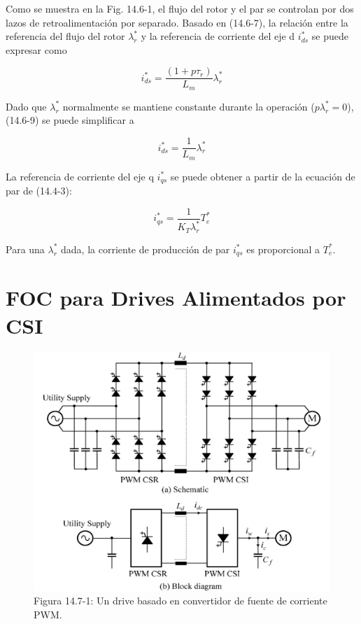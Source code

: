 \documentclass[letterpaper,12pt]{article}
\begin{document}
Como se muestra en la Fig. 14.6-1, el flujo del rotor y el par se controlan por dos lazos de retroalimentación por separado. Basado en (14.6-7), la relación entre la referencia del flujo del rotor $\lambda_r^*$ y la referencia de corriente del eje d $i_{ds}^*$ se puede expresar como

\begin{equation}
i_{ds}^* = \frac{(1 + p \tau_r)}{L_m} \lambda_r^* \tag{14.6-9}
\end{equation}

Dado que $\lambda_r^*$ normalmente se mantiene constante durante la operación ($p \lambda_r^* = 0$), (14.6-9) se puede simplificar a

\begin{equation}
i_{ds}^* = \frac{1}{L_m} \lambda_r^* \tag{14.6-10}
\end{equation}

La referencia de corriente del eje q $i_{qs}^*$ se puede obtener a partir de la ecuación de par de (14.4-3):

\begin{equation}
i_{qs}^* = \frac{1}{K_T \lambda_r^*} T_e^* \tag{14.6-11}
\end{equation}

Para una $\lambda_r^*$ dada, la corriente de producción de par $i_{qs}^*$ es proporcional a $T_e^*$.

\clearpage
\section{FOC para Drives Alimentados por CSI}

\begin{figure}[ht]
\centering
\includegraphics{graficos/img20.jpg}
\caption{Figura 14.7-1: Un drive basado en convertidor de fuente de corriente PWM.}
\end{figure}
\FloatBarrier
\end{document}
